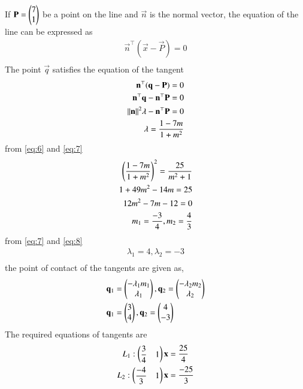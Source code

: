 \documentclass[journal,12pt,twocolumn]{IEEEtran}
\begin{document}
If $\mathbf{P} = \begin{pmatrix}7 \\ 1\end{pmatrix} $ be a point on the line and $\vec{n}$ is
the normal vector, the equation of the line can
be expressed as
\begin{align}
\vec{n}^{\top}(\vec{x} -\vec{P} ) = 0\\
\end{align}
The point $\vec{q}$ satisfies the equation of the tangent
\begin{align}
\mathbf{n}^{\top}(\mathbf{q} -\mathbf{P} ) = 0\\
\mathbf{n}^{\top}\mathbf{q} -\mathbf{n}^{\top}\mathbf{P}  = 0\\
\lVert\mathbf{n}\rVert^{2}\lambda -\mathbf{n}^{\top}\mathbf{P}  = 0\\
\lambda = \dfrac{1- 7m}{1+ m^{2}} \label{eq:7}
\end{align}
from \eqref{eq:6} and \eqref{eq:7}
\begin{align}
\left(\dfrac{1- 7m}{1+ m^{2}}\right)^{2} = \dfrac{25}{m^{2} + 1}\\
1+ 49m^{2} -14m = 25\\
12m^{2} -7m - 12=0\\
m_{1} =\dfrac{-3}{4} , m_{2} =\dfrac{4}{3} \label{eq:8}
\end{align}
from \eqref{eq:7} and \eqref{eq:8}
\begin{align}
\lambda_{1}= 4 , \lambda_{2}= -3\\
\end{align}
the point of contact of the tangents are given as,
\begin{align}
\mathbf{q}_{1} &=\begin{pmatrix}-\lambda_{1} m _{1}\\ \lambda_{1}\end{pmatrix},\mathbf{q}_{2} =\begin{pmatrix}-\lambda_{2} m _{2}\\ \lambda_{2}\end{pmatrix}\\
\mathbf{q}_{1} &=\begin{pmatrix}3\\ 4\end{pmatrix},\mathbf{q}_{2} =\begin{pmatrix}4\\-3\end{pmatrix}
\end{align}
The required equations of tangents are
\begin{align}
    L_1: \begin{pmatrix}\dfrac{3}{4}&1\end{pmatrix}\mathbf{x}&=\dfrac{25}{4}\\
    L_2: \begin{pmatrix}\dfrac{-4}{3}&1\end{pmatrix}\mathbf{x}&=\dfrac{-25}{3}
\end{align}
\end{document}
